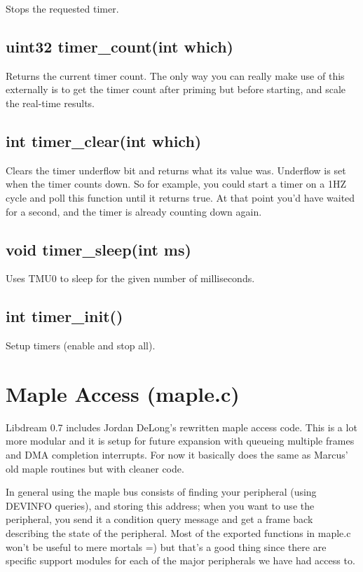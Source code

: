 \documentclass[english]{report}
\begin{document}
Stops the requested timer.


\subsection{uint32 timer\_count(int which)}

Returns the current timer count. The only way you can really make
use of this externally is to get the timer count after priming but
before starting, and scale the real-time results.


\subsection{int timer\_clear(int which)}

Clears the timer underflow bit and returns what its value was. Underflow
is set when the timer counts down. So for example, you could start
a timer on a 1HZ cycle and poll this function until it returns true.
At that point you'd have waited for a second, and the timer is already
counting down again.


\subsection{void timer\_sleep(int ms)}

Uses TMU0 to sleep for the given number of milliseconds.


\subsection{int timer\_init()}

Setup timers (enable and stop all).


\section{Maple Access (maple.c)}

Libdream 0.7 includes Jordan DeLong's rewritten maple access code.
This is a lot more modular and it is setup for future expansion with
queueing multiple frames and DMA completion interrupts. For now it
basically does the same as Marcus' old maple routines but with cleaner
code.

In general using the maple bus consists of finding your peripheral
(using DEVINFO queries), and storing this address; when you want to
use the peripheral, you send it a condition query message and get
a frame back describing the state of the peripheral. Most of the exported
functions in maple.c won't be useful to mere mortals =) but that's
a good thing since there are specific support modules for each of
the major peripherals we have had access to.
\end{document}
